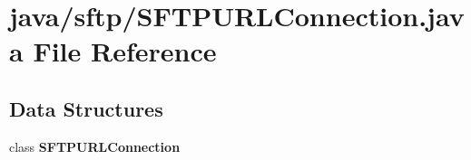 \section{java/sftp/\-S\-F\-T\-P\-U\-R\-L\-Connection.java File Reference}
\label{SFTPURLConnection_8java}
\subsection*{Data Structures}
\begin{DoxyCompactItemize}
\item 
class {\bf S\-F\-T\-P\-U\-R\-L\-Connection}
\end{DoxyCompactItemize}
